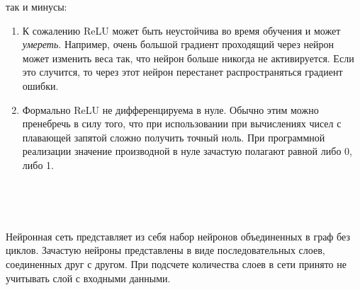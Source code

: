 \begin{itemize}
так и минусы:
  \begin{enumerate}[label=\arabic*)]
    \item К сожалению ReLU может быть неустойчива во время обучения и может \textit{умереть}. Например, очень большой градиент проходящий через нейрон может изменить веса так, что нейрон больше никогда не активируется. Если это случится, то через этот нейрон перестанет распространяться градиент ошибки.
    \item Формально ReLU не дифференцируема в нуле. Обычно этим можно пренебречь в силу того, что при использовании при вычислениях чисел с плавающей запятой сложно получить точный ноль. При программной реализации значение производной в нуле зачастую полагают равной либо 0, либо 1. 
  \end{enumerate}
  \

\end{itemize}
\

Нейронная сеть представляет из себя набор нейронов объединенных в граф без циклов. Зачастую нейроны представлены в виде последовательных слоев, соединенных друг с другом. При подсчете количества слоев в сети принято не учитывать слой с входными данными.





%
